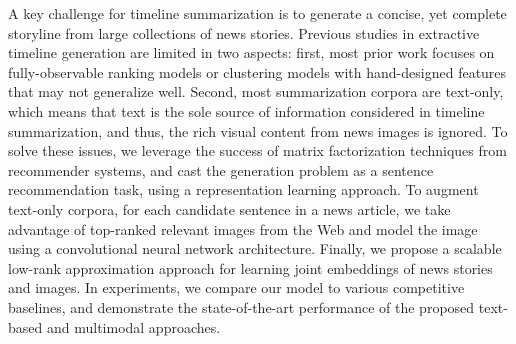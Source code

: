 A key challenge for timeline summarization is to generate a concise, yet complete storyline from large collections of news stories. Previous studies in extractive timeline generation are limited in two aspects: first, most prior work focuses on fully-observable ranking models or clustering models with hand-designed features that may not generalize well. Second, most summarization corpora are text-only, which means that text is the sole source of information considered in timeline summarization, and thus, the rich visual content from news images is ignored. To solve these issues, we leverage the success of matrix factorization techniques from recommender systems, and cast the generation problem as a sentence recommendation task, using a representation learning approach. To augment text-only corpora, for each candidate sentence in a news article, we take advantage of top-ranked relevant images from the Web and model the image using a convolutional neural network architecture. Finally, we propose a scalable low-rank approximation approach for learning  joint embeddings of news stories and images. In experiments, we compare our model to various competitive baselines, and demonstrate the state-of-the-art performance of the proposed text-based and multimodal approaches.
